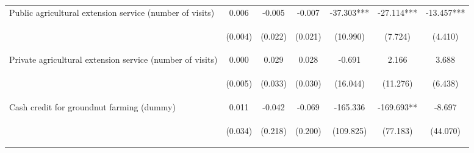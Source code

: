 \begin{center}
\begin{tabular}{lcccccc}
Public agricultural extension service (number of visits) & 0.006 & -0.005 & -0.007 & -37.303*** & -27.114*** & -13.457*** \\
\vspace{4pt} & \begin{footnotesize}(0.004)\end{footnotesize} & \begin{footnotesize}(0.022)\end{footnotesize} & \begin{footnotesize}(0.021)\end{footnotesize} & \begin{footnotesize}(10.990)\end{footnotesize} & \begin{footnotesize}(7.724)\end{footnotesize} & \begin{footnotesize}(4.410)\end{footnotesize} \\
Private agricultural extension service (number of visits) & 0.000 & 0.029 & 0.028 & -0.691 & 2.166 & 3.688 \\
\vspace{4pt} & \begin{footnotesize}(0.005)\end{footnotesize} & \begin{footnotesize}(0.033)\end{footnotesize} & \begin{footnotesize}(0.030)\end{footnotesize} & \begin{footnotesize}(16.044)\end{footnotesize} & \begin{footnotesize}(11.276)\end{footnotesize} & \begin{footnotesize}(6.438)\end{footnotesize} \\
Cash credit for groundnut farming (dummy) & 0.011 & -0.042 & -0.069 & -165.336 & -169.693** & -8.697 \\
\vspace{4pt} & \begin{footnotesize}(0.034)\end{footnotesize} & \begin{footnotesize}(0.218)\end{footnotesize} & \begin{footnotesize}(0.200)\end{footnotesize} & \begin{footnotesize}(109.825)\end{footnotesize} & \begin{footnotesize}(77.183)\end{footnotesize} & \begin{footnotesize}(44.070)\end{footnotesize} \\

\end{tabular}
\end{center}
